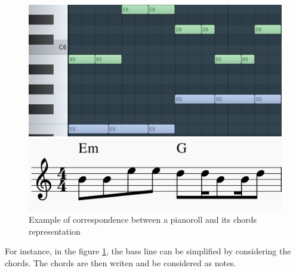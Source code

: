 \documentclass[12pt]{report}
\begin{document}
\begin{figure}[H]
   \begin{minipage}{0.5\textwidth}
     \centering
     \includegraphics[width=.9\linewidth]{images/music/pianoroll/pianoroll_small.jpg}
   \end{minipage}\hfill
   \begin{minipage}{0.5\textwidth}
     \centering
     \includegraphics[width=.9\linewidth]{images/music/stave/stave_with_chords.jpg}
   \end{minipage}
 \caption{Example of correspondence between a pianoroll and its chords representation}
 \label{fig:pianoroll_to_chords}
\end{figure}

For instance, in the figure \ref{fig:pianoroll_to_chords}, the bass line can be simplified by considering the chords.
The chords are then writen and be considered as notes.


\end{document}
